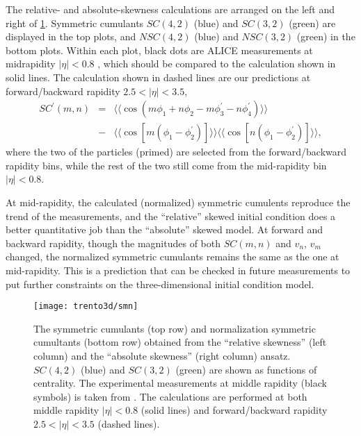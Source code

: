 The relative- and absolute-skewness calculations are arranged on the left and right of \ref{fig:trento:smn}. 
Symmetric cumulants $SC(4,2)$ (blue) and $SC(3,2)$ (green) are displayed in the top plots, and $NSC(4,2)$ (blue) and $NSC(3,2)$ (green) in the bottom plots.
Within each plot, black dots are ALICE measurements at midrapidity $|\eta|<0.8$ \cite{ALICE:2016kpq}, which should be compared to the calculation shown in solid lines.
The calculation shown in dashed lines are our predictions at forward/backward rapidity $2.5 < |\eta| < 3.5$,
\begin{eqnarray}
SC^\prime(m, n) &=& \langle\langle \cos(m\phi_1+n\phi_2-m\phi_3^\prime-n\phi_4^\prime)\rangle\rangle \\
\nonumber &-& \langle\langle\cos[m(\phi_1-\phi_2^\prime)]\rangle\rangle\langle\langle\cos[n(\phi_1-\phi_2^\prime)]\rangle\rangle, \label{eq:scmn}
\end{eqnarray}
where the two of the particles (primed) are selected from the forward/backward rapidity bins, while the rest of the two still come from the mid-rapidity bin $|\eta|<0.8$.

At mid-rapidity, the calculated (normalized) symmetric cumulents reproduce the trend of the measurements, and the ``relative'' skewed initial condition does a better quantitative job than the ``absolute'' skewed model.
At forward and backward rapidity, though the magnitudes of both $SC(m,n)$ and $v_n$, $v_m$ changed, the normalized symmetric cumulants remains the same as the one at mid-rapidity.
This is a prediction that can be checked in future measurements to put further constraints on the three-dimensional initial condition model.

\begin{figure}
\texttt{[image: trento3d/smn]}
\caption{The symmetric cumulants (top row) and normalization symmetric cumultants (bottom row) obtained from the ``relative skewness'' (left column) and the ``absolute skewness'' (right column) ansatz.
$SC(4,2)$ (blue) and $SC(3,2)$ (green) are shown as functions of centrality. The experimental measurements at middle rapidity (black symbols) is taken from \cite{ALICE:2016kpq}.
The calculations are performed at both middle rapidity $|\eta|<0.8$ (solid lines) and forward/backward rapidity $2.5<|\eta|<3.5$ (dashed lines).
}
\label{fig:trento:smn} 
\end{figure}

